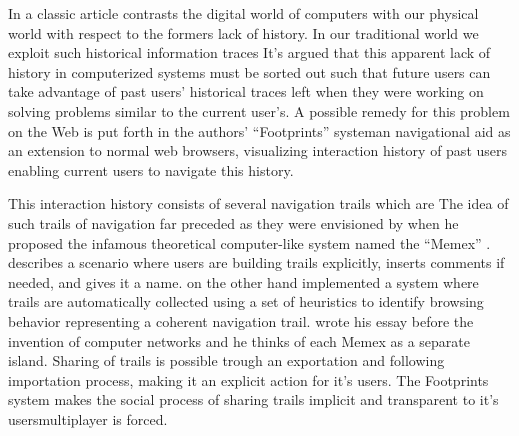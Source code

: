 In a classic article \citet{wexelblat99} contrasts the digital world of
computers with our physical world with respect to the formers lack of history.
In our traditional world we exploit such historical information traces
It's argued that this apparent lack of history in computerized systems must
be sorted out such that future users can take advantage
of past users' historical traces left when they were working
on solving problems similar to the current user's.
A possible remedy for this problem on the Web is put forth in the authors'
``Footprints'' system\dash{}an navigational aid as an extension to normal web
browsers, visualizing interaction history of past users enabling current
users to navigate this history.

This interaction history consists of several navigation trails which are
The idea of such trails of navigation far preceded \citeauthor{wexelblat99}
as they were envisioned by \citet{bush45} when he proposed the infamous
theoretical computer-like system named the ``Memex''%
.
\citeauthor{bush45} describes a scenario where users are building trails
explicitly, inserts comments if needed, and gives it a name.
\citeauthor{wexelblat99} on the other hand
implemented a system where trails are automatically collected using a set of
heuristics to identify browsing behavior representing a coherent navigation
trail.
\citeauthor{bush45} wrote his essay before the invention of computer networks
and he thinks of each Memex as a separate island. Sharing of trails is
possible trough an exportation and following importation process, making it an
explicit action for it's users.
The Footprints system makes the social process of sharing trails implicit and
transparent to it's users\dash{}multiplayer is forced.

